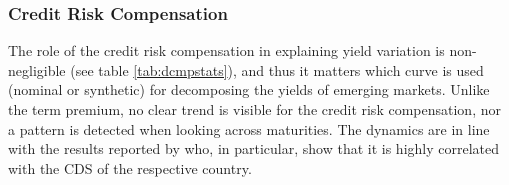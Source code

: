 {\subsubsection{Credit Risk Compensation} \label{sec:CRC}
\iftoggle{toclinks}{\gototoc}{} %

The role of the credit risk compensation in explaining yield variation is non-negligible (see table \ref{tab:dcmpstats}), and thus it matters which curve is used (nominal or synthetic) for decomposing the yields of emerging markets. 
Unlike the term premium, no clear trend is visible for the credit risk compensation, nor a pattern is detected when looking across maturities.
The dynamics are in line with the results reported by \cite{DuSchreger:2016JoF} who, in particular, show that it is highly correlated with the CDS of the respective country.

}
